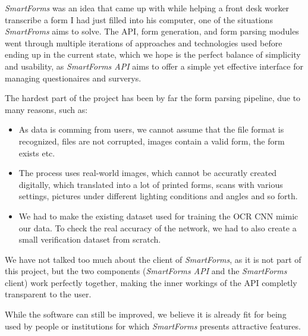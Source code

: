 \documentclass[11pt, a4paper]{report}
\begin{document}
\textit{SmartForms} was an idea that came up with while helping a front desk worker transcribe a form I had just filled into his computer, one of the situations \textit{SmartFroms} aims to solve. The API, form generation, and form parsing modules went through multiple iterations of approaches and technologies used before ending up in the current state, which we hope is the perfect balance of simplicity and usability, as \textit{SmartForms API} aims to offer a simple yet effective interface for managing questionaires and surverys.

The hardest part of the project has been by far the form parsing pipeline, due to many reasons, such as:
\begin{itemize}
	\item As data is comming from users, we cannot assume that the file format is recognized, files are not corrupted, images contain a valid form, the form exists etc.
	\item The process uses real-world images, which cannot be accuratly created digitally, which translated into a lot of printed forms, scans with various settings, pictures under different lighting conditions and angles and so forth.
	\item We had to make the existing dataset used for training the OCR CNN mimic our data. To check the real accuracy of the network, we had to also create a small verification dataset from scratch.
\end{itemize}

We have not talked too much about the client of \textit{SmartForms}, as it is not part of this project, but the two components (\textit{SmartForms API} and the \textit{SmartForms} client) work perfectly together, making the inner workings of the API completly transparent to the user.


While the software can still be improved, we believe it is already fit for being used by people or institutions for which \textit{SmartForms} presents attractive features.
\end{document}
